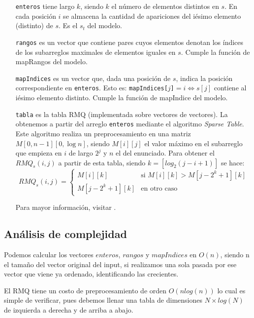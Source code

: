 \begin{itemize}
  \item[\tt enteros] tiene largo $k$, siendo $k$ el número de elementos
  distintos en $s$. En cada posición $i$ se almacena la cantidad de apariciones
  del iésimo elemento (distinto) de $s$. Es el $s_t$ del modelo.

  \item[\tt rangos] es un vector que contiene pares cuyos elementos denotan
  los índices de los subarreglos maximales de elementos iguales en $s$. Cumple
  la función de mapRangos del modelo.

  \item[\tt mapIndices] es un vector que, dada una posición de $s$, indica la posición
  correspondiente en {\tt enteros}. Esto es: {\tt mapIndices[$j$]}$=i \Leftrightarrow s[j]$
  contiene al iésimo elemento distinto. Cumple la función de mapIndice del modelo.

  \item[\tt tabla] es la tabla RMQ (implementada sobre vectores de vectores).
  La obtenemos a partir del arreglo {\tt enteros} mediante el algoritmo {\sl
  Sparse Table}. Este algoritmo realiza un preprocesamiento en una matriz
  $M[0,n-1][0,\log n]$, siendo $M[i][j]$ el valor máximo en el subarreglo
  que empieza en $i$ de largo $2^j$ y $n$ el del enunciado. Para obtener el $RMQ_s(i, j)$ a partir
  de esta tabla, siendo $k = [log_2(j - i + 1)]$ se hace:
  \[ RMQ_s(i, j) = \left\{ \begin{array}{ll}
                 M[i][k] & \mbox{si $M[i][k] > M[j-2^k+1][k]$}\\
                 M[j-2^k+1][k] & \mbox{en otro caso}\end{array} \right. \]

  Para mayor información, visitar \cite{topcoder}.
\end{itemize}

\subsection*{Análisis de complejidad}

Podemos calcular los vectores $enteros$, $rangos$ y $mapIndices$ en $O(n)$, siendo n el tamaño del
vector original del input, si realizamos una sola pasada por ese vector que viene ya ordenado,
identificando las crecientes.

El RMQ tiene un costo de preprocesamiento de orden $O(nlog(n))$ lo cual es simple de verificar, pues
debemos llenar una tabla de dimensiones $N \times log(N)$ de izquierda a derecha y de arriba a abajo.

